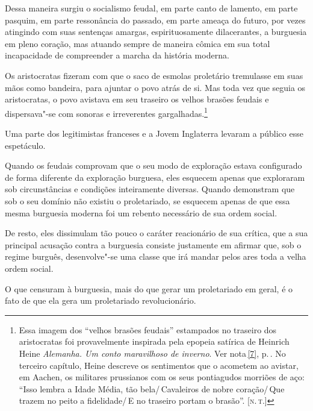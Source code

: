 Dessa maneira surgiu o socialismo feudal, em parte canto de lamento, em
parte pasquim, em parte ressonância do passado, em parte ameaça do
futuro, por vezes atingindo com suas sentenças amargas,
espirituosamente dilacerantes, a burguesia em pleno coração, mas
atuando sempre de maneira cômica em sua total incapacidade de
compreender a marcha da história moderna.

Os aristocratas fizeram com que o saco de esmolas proletário
tremulasse em suas mãos como bandeira, para ajuntar o povo atrás de si.
Mas toda vez que seguia os aristocratas, o povo avistava em seu
traseiro os velhos brasões feudais e dispersava"-se com sonoras e
irreverentes
gargalhadas.\footnote{ Essa imagem dos ``velhos brasões feudais''
estampados no traseiro dos aristocratas foi provavelmente inspirada
pela epopeia satírica de Heinrich Heine \textit{Alemanha. Um
conto maravilhoso de inverno}. Ver nota\,\ref{7}, p.\,\pageref{7}. No terceiro capítulo, Heine
descreve os sentimentos que o acometem ao avistar, em Aachen, os
militares prussianos com os seus pontiagudos morriões de aço: ``Isso
lembra a Idade Média, tão bela/\,Cavaleiros de nobre coração/\,Que
trazem no peito a fidelidade/\,E no traseiro portam o brasão''. [\textsc{n.\,t.}]}

Uma parte dos legitimistas franceses e a Jovem Inglaterra levaram a
público esse espetáculo.

Quando os feudais comprovam que o seu modo de exploração estava
configurado de forma diferente da exploração burguesa, eles esquecem
apenas que exploraram sob circunstâncias e condições inteiramente
diversas. Quando demonstram que sob o seu domínio não existiu o
proletariado, se esquecem apenas de que essa mesma burguesia
moderna foi um rebento necessário de sua ordem social.

De resto, eles dissimulam tão pouco o caráter reacionário de sua crítica,
que a sua principal acusação contra a burguesia consiste justamente em
afirmar que, sob o regime burguês, desenvolve"-se uma classe que irá
mandar pelos ares toda a velha ordem social.

O que censuram à burguesia, mais do que gerar um proletariado em geral,
é o fato de que ela gera um proletariado revolucionário.


